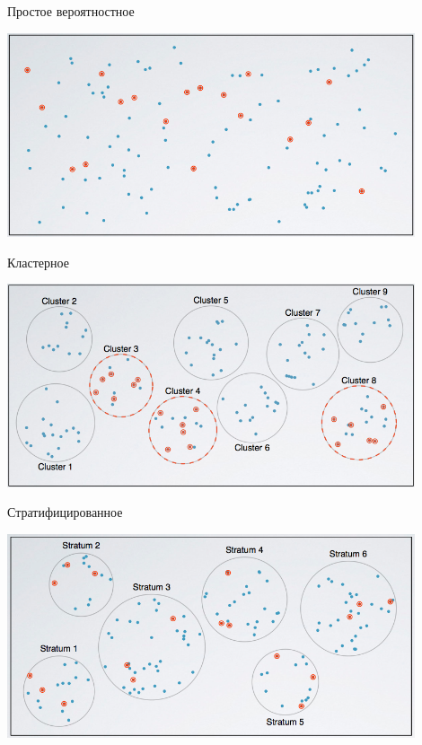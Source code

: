 \documentclass[14pt, fleqn, xcolor={dvipsnames, table}]{beamer}
\begin{document}
\begin{frame}{Простое вероятностное}
\begin{center}
\includegraphics[width=0.9\textwidth]{Simple}
\end{center}
\end{frame}

\begin{frame}{Кластерное}
\begin{center}
\includegraphics[width=0.9\textwidth]{Cluster}
\end{center}
\end{frame}

\begin{frame}{Стратифицированное}
\begin{center}
\includegraphics[width=0.9\textwidth]{Stratified}
\end{center}
\end{frame}
\end{document}
